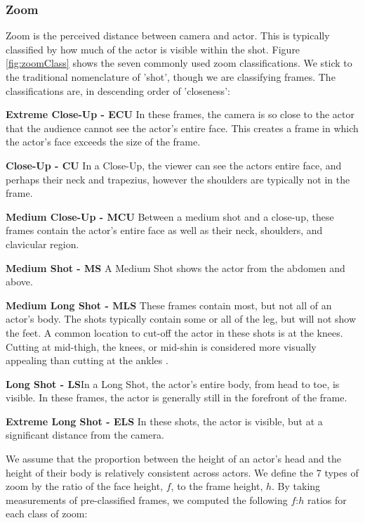 \subsubsection{Zoom}
Zoom is the perceived distance between camera and actor. This is typically classified by how much of the actor is visible within the shot. Figure \ref{fig:zoomClass} shows the seven commonly used zoom classifications. We stick to the traditional nomenclature of 'shot', though we are classifying frames. The classifications  are, in descending order of 'closeness':


\textbf{Extreme Close-Up - ECU} In these frames, the camera is so close to the actor that the audience cannot see the actor's entire face. This creates a frame in which the actor's face exceeds the size of the frame.

\textbf{Close-Up - CU} In a Close-Up, the viewer can see the actors entire face, and perhaps their neck and trapezius, however the shoulders are typically not in the frame. 

\textbf{Medium Close-Up - MCU} Between a medium shot and a close-up, these frames contain the actor's entire face as well as their neck, shoulders, and clavicular region. 

\textbf{Medium Shot - MS} A Medium Shot shows the actor from the abdomen and above. 

\textbf{Medium Long Shot - MLS} These frames contain most, but not all of an actor's body. The shots typically contain some or all of the leg, but will not show the feet. A common location to cut-off the actor in these shots is at the knees. Cutting at mid-thigh, the knees, or mid-shin is considered more visually appealing than cutting at the ankles \cite{arijon_grammar_1991}.

\textbf{Long Shot - LS}In a Long Shot, the actor's entire body, from head to toe, is visible. In these frames, the actor is generally still in the forefront of the frame. 

\textbf{Extreme Long Shot - ELS} In these shots, the actor is visible, but at a significant distance from the camera. 


We assume that the proportion between the height of an actor's head and the height of their body is relatively consistent across actors. We define the 7 types of zoom by the ratio of the face height, $f$, to the frame height, $h$. By taking measurements of pre-classified frames, we computed the following $f$:$h$ ratios for each class of zoom:



